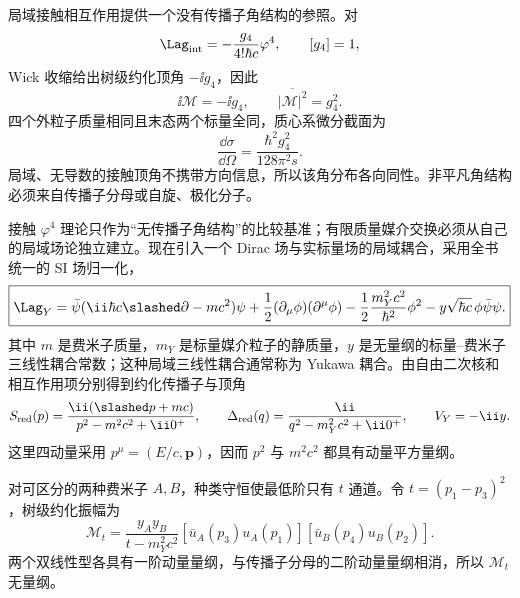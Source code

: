 
局域接触相互作用提供一个没有传播子角结构的参照。对
\begin{equation*}
 \Lag_{\rm int}=-\frac{g_4}{4!\hbar c}\varphi^4,
 \qquad [g_4]=1,
\end{equation*}
Wick 收缩给出树级约化顶角 $-\ii g_4$，因此
\begin{equation}
 \ii\mathcal M=-\ii g_4,
 \qquad
 \overline{|\mathcal M|^2}=g_4^2.
 \label{eq:phi4-M-tree-si-r10}
\end{equation}
四个外粒子质量相同且末态两个标量全同，质心系微分截面为
\begin{equation}
 \boxed{
 \frac{\dd\sigma}{\dd\Omega}
 =\frac{\hbar^2g_4^2}{128\pi^2s}.}
 \label{eq:phi4-isotropic-cross-si-r10}
\end{equation}
局域、无导数的接触顶角不携带方向信息，所以该角分布各向同性。非平凡角结构必须来自传播子分母或自旋、极化分子。

接触 $\varphi^4$ 理论只作为“无传播子角结构”的比较基准；有限质量媒介交换必须从自己的局域场论独立建立。现在引入一个 Dirac 场与实标量场的局域耦合，采用全书统一的 SI 场归一化，
\begin{equation}
 \boxed{
 \Lag_Y
 =\bar\psi(\ii\hbar c\slashed\partial-mc^2)\psi
 +\frac12(\partial_\mu\phi)(\partial^\mu\phi)
 -\frac12\frac{m_Y^2c^2}{\hbar^2}\phi^2
 -y\sqrt{\hbar c}\,\phi\bar\psi\psi.}
 \label{eq:yukawa-full-si-r10}
\end{equation}
其中 $m$ 是费米子质量，$m_Y$ 是标量媒介粒子的静质量，$y$ 是无量纲的标量--费米子三线性耦合常数；这种局域三线性耦合通常称为 Yukawa 耦合。由自由二次核和相互作用项分别得到约化传播子与顶角
\begin{equation}
 S_{\rm red}(p)=\frac{\ii(\slashed p+mc)}{p^2-m^2c^2+\ii0^+},
 \qquad
 \Delta_{\rm red}(q)=\frac{\ii}{q^2-m_Y^2c^2+\ii0^+},
 \qquad
 V_Y=-\ii y.
 \label{eq:yukawa-propagators-si-r10}
\end{equation}
这里四动量采用 $p^\mu=(E/c,\mathbf p)$，因而 $p^2$ 与 $m^2c^2$ 都具有动量平方量纲。

对可区分的两种费米子 $A,B$，种类守恒使最低阶只有 $t$ 通道。令 $t=(p_1-p_3)^2$，树级约化振幅为
\begin{equation}
 \boxed{
 \mathcal M_t
 =\frac{y_Ay_B}{t-m_Y^2c^2}
 [\bar u_A(p_3)u_A(p_1)]
 [\bar u_B(p_4)u_B(p_2)].}
 \label{eq:yukawa-distinguishable-M-si-r10}
\end{equation}
两个双线性型各具有一阶动量量纲，与传播子分母的二阶动量量纲相消，所以 $\mathcal M_t$ 无量纲。

